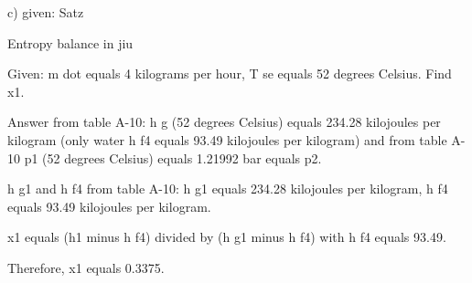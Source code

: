 c) given: Satz

Entropy balance in jiu

Given: m dot equals 4 kilograms per hour, T se equals 52 degrees Celsius. Find x1.

Answer from table A-10: h g (52 degrees Celsius) equals 234.28 kilojoules per kilogram (only water h f4 equals 93.49 kilojoules per kilogram) and from table A-10 p1 (52 degrees Celsius) equals 1.21992 bar equals p2.

h g1 and h f4 from table A-10: h g1 equals 234.28 kilojoules per kilogram, h f4 equals 93.49 kilojoules per kilogram.

x1 equals (h1 minus h f4) divided by (h g1 minus h f4) with h f4 equals 93.49.

Therefore, x1 equals 0.3375.